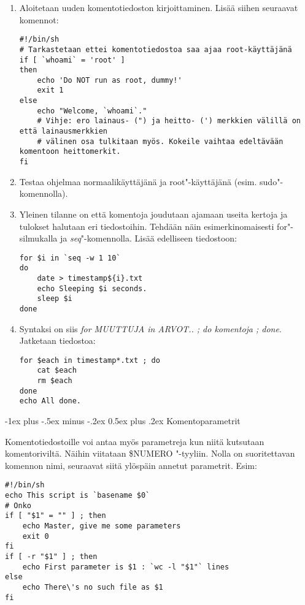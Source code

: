 \documentclass[12pt,portrait,a4]{article}
\makeatletter
\renewcommand{\section}{\@startsection{section}{1}{0mm}%
                                {-1ex plus -.5ex minus -.2ex}%
                                {0.5ex plus .2ex}%
                                {\normalfont\large\bfseries}}
\makeatother
\begin{document}
\begin{enumerate}
\item Aloitetaan uuden komentotiedoston kirjoittaminen.  Lisää siihen
seuraavat komennot:
\begin{verbatim}
#!/bin/sh
# Tarkastetaan ettei komentotiedostoa saa ajaa root-käyttäjänä
if [ `whoami` = 'root' ]
then
    echo 'Do NOT run as root, dummy!'
    exit 1
else
    echo "Welcome, `whoami`."
    # Vihje: ero lainaus- (") ja heitto- (') merkkien välillä on että lainausmerkkien
    # välinen osa tulkitaan myös. Kokeile vaihtaa edeltävään komentoon heittomerkit.
fi
\end{verbatim}
\item Testaa ohjelmaa normaalikäyttäjänä ja root"-käyttäjänä (esim.
sudo"-komennolla).
\item Yleinen tilanne on että komentoja joudutaan ajamaan useita kertoja ja
tulokset halutaan eri tiedostoihin.  Tehdään näin esimerkinomaisesti
for"-silmukalla ja \emph{seq}"-komennolla.  Lisää edelliseen tiedostoon:
\begin{verbatim}
for $i in `seq -w 1 10`
do
    date > timestamp${i}.txt
    echo Sleeping $i seconds.
    sleep $i
done
\end{verbatim}
\item Syntaksi on siis \emph{for MUUTTUJA in ARVOT.. ; do komentoja ; done}.
Jatketaan tiedostoa:
\begin{verbatim}
for $each in timestamp*.txt ; do
    cat $each
    rm $each
done
echo All done.
\end{verbatim}

\end{enumerate}

\section{Komentoparametrit}

Komentotiedostoille voi antaa myös parametreja kun niitä kutsutaan
komentoriviltä.  Näihin viitataan \$NUMERO "-tyyliin.  Nolla on
suoritettavan komennon nimi, seuraavat siitä ylöspäin annetut parametrit. 
Esim:

\begin{verbatim}
#!/bin/sh
echo This script is `basename $0`
# Onko 
if [ "$1" = "" ] ; then
    echo Master, give me some parameters
    exit 0
fi
if [ -r "$1" ] ; then
    echo First parameter is $1 : `wc -l "$1"` lines
else
    echo There\'s no such file as $1
fi
\end{verbatim}
\end{document}
